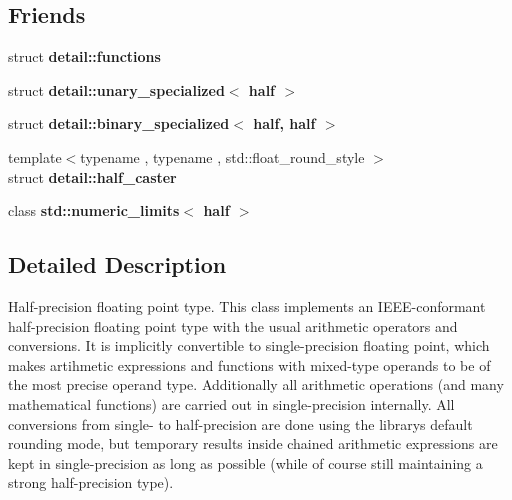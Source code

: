 \subsection*{Friends}
\begin{DoxyCompactItemize}
\item 
struct {\bfseries detail\+::functions}\hypertarget{classhalf__float_1_1half_a8c62dbcc77cd228ff65300d012535a09}{}\label{classhalf__float_1_1half_a8c62dbcc77cd228ff65300d012535a09}

\item 
struct {\bfseries detail\+::unary\+\_\+specialized$<$ half $>$}\hypertarget{classhalf__float_1_1half_a66a5c900a45b9733983fc83ae3beaa4e}{}\label{classhalf__float_1_1half_a66a5c900a45b9733983fc83ae3beaa4e}

\item 
struct {\bfseries detail\+::binary\+\_\+specialized$<$ half, half $>$}\hypertarget{classhalf__float_1_1half_a0549e53309bef497d5ce1d1ad89c4bc4}{}\label{classhalf__float_1_1half_a0549e53309bef497d5ce1d1ad89c4bc4}

\item 
{\footnotesize template$<$typename , typename , std\+::float\+\_\+round\+\_\+style $>$ }\\struct {\bfseries detail\+::half\+\_\+caster}\hypertarget{classhalf__float_1_1half_a2ff50b0344ffe4a76ba5d7c868fa8ffa}{}\label{classhalf__float_1_1half_a2ff50b0344ffe4a76ba5d7c868fa8ffa}

\item 
class {\bfseries std\+::numeric\+\_\+limits$<$ half $>$}\hypertarget{classhalf__float_1_1half_a30984629ce0edc2c2e5de40c72ab0292}{}\label{classhalf__float_1_1half_a30984629ce0edc2c2e5de40c72ab0292}

\end{DoxyCompactItemize}


\subsection{Detailed Description}
Half-\/precision floating point type. This class implements an I\+E\+E\+E-\/conformant half-\/precision floating point type with the usual arithmetic operators and conversions. It is implicitly convertible to single-\/precision floating point, which makes artihmetic expressions and functions with mixed-\/type operands to be of the most precise operand type. Additionally all arithmetic operations (and many mathematical functions) are carried out in single-\/precision internally. All conversions from single-\/ to half-\/precision are done using the library\textquotesingle{}s default rounding mode, but temporary results inside chained arithmetic expressions are kept in single-\/precision as long as possible (while of course still maintaining a strong half-\/precision type).

